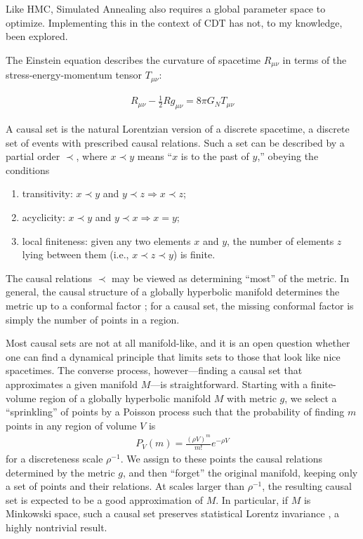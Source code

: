 \documentclass[12pt]{article}
\makeatletter
\def\section{\@startsection{section}{1}{\z@}{3.5ex plus 1ex minus
   .2ex}{2.3ex plus .2ex}{\large\bf}}
\makeatother
\begin{document}
Like HMC, Simulated Annealing also requires a global parameter space to optimize.\cite{busetti_simulated_nodate} Implementing this in the context of CDT has not, to my knowledge, been explored.

\section{Background}

The Einstein equation describes the curvature of spacetime $R_{\mu\nu}$ in terms of the stress-energy-momentum tensor $T_{\mu\nu}$:

\begin{align}
  R_{\mu\nu}-\frac{1}{2}Rg_{\mu\nu}=8\pi G_{N}T_{\mu\nu}
\end{align}



A causal set  is the natural Lorentzian version of a discrete spacetime,
a discrete set of events with prescribed causal relations.  Such a set can be described
by a partial order $\prec$, where $x\prec y$ means ``$x$ is to the past of $y$,''
obeying the conditions\\[-4ex]
\begin{enumerate}\addtolength{\itemsep}{-1.5ex}
\item transitivity: $x\prec y$ and $y\prec z \Rightarrow x\prec z$;
\item acyclicity: $x \prec y$ and $y \prec x \Rightarrow x=y$;
\item local finiteness: given any two elements $x$ and $y$, the number of elements
   $z$ lying between them (i.e.,  $x\prec z\prec y$) is finite.
\end{enumerate}
\vspace*{-1ex}
The causal relations $\prec$ may be viewed as determining ``most'' of the metric.
In general, the causal structure of a globally hyperbolic manifold determines the metric
up to a conformal factor ; for a causal set, the missing conformal factor
is simply the number of points in a region.

Most causal sets are not at all manifold-like, and it is an open question whether one
can find a dynamical principle that limits sets to those that look like nice spacetimes.
The converse process, however---finding a causal set that approximates
a given manifold $M$---is straightforward.   Starting with a finite-volume region of a
globally hyperbolic manifold $M$ with metric $g$, we select  a ``sprinkling'' of points
by a Poisson process such that the probability of finding $m$ points in any region of
volume $V$ is
\begin{align}
P_V(m) = \frac{(\rho V)^m}{m!}e^{-\rho V}
\label{a1}
\end{align}
for a discreteness scale $\rho^{-1}$.  We assign to these points the causal relations
determined by the metric $g$, and then ``forget'' the original manifold, keeping only
a set of points and their relations.   At scales larger than $\rho^{-1}$, the resulting
causal set is expected to be a good approximation of $M$.  In particular, if $M$ is
Minkowski space, such a causal set preserves statistical Lorentz invariance ,
a highly nontrivial result.
\end{document}
